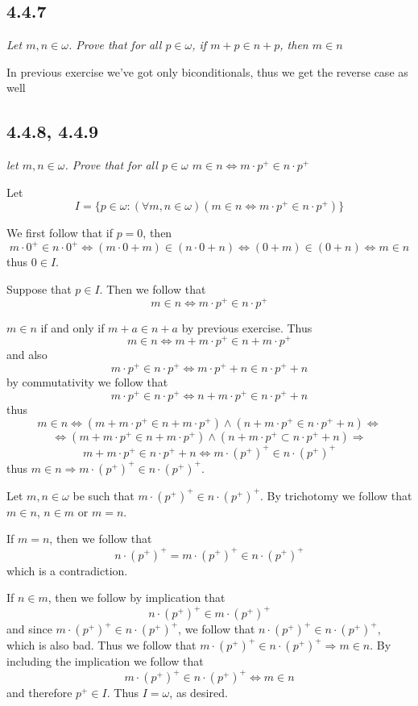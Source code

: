 \documentclass[11pt,oneside,titlepage]{book}
\DeclareMathOperator \lra {\Leftrightarrow}
\DeclareMathOperator \ra {\Rightarrow}
\begin{document}
\subsection*{4.4.7}

\textit{Let $m, n \in \omega$. Prove that for all $p \in \omega$, if $m + p \in n + p$, then
  $m \in n$}

In previous exercise we've got only biconditionals, thus we get the reverse case as well

\subsection*{4.4.8, 4.4.9}

\textit{let $m, n \in \omega$. Prove that for all $p \in \omega$ $m \in n \lra
  m \cdot p^+ \in n \cdot p^+$}

Let
$$I = \{p \in \omega: (\forall m, n \in \omega)( m \in n \lra  m \cdot p^+ \in n \cdot p^+)\}$$

We first follow that if $p = 0$, then
$$m \cdot 0^+ \in n \cdot 0^+ \lra (m \cdot 0 + m) \in (n \cdot 0 + n) \lra (0 + m) \in (0 + n)
\lra m \in n$$
thus $0 \in I$.

Suppose that $p \in I$. Then we follow that
$$m \in n \lra m \cdot p^+ \in n \cdot p^+$$

$m \in n$ if and only if $m + a \in n + a$ by previous exercise. Thus
$$m \in n \lra m + m \cdot p^+ \in n + m \cdot p^+$$
and also
$$ m \cdot p^+ \in n \cdot p^+ \lra  m \cdot p^+ + n \in n \cdot p^+  + n$$
by commutativity we follow that
$$ m \cdot p^+ \in n \cdot p^+ \lra  n + m \cdot p^+ \in n \cdot p^+  + n$$
thus
$$m \in n \lra (m + m \cdot p^+ \in n + m \cdot p^+) \land (n + m \cdot p^+ \in n \cdot p^+  + n)
\lra$$
$$\lra (m + m \cdot p^+ \in n + m \cdot p^+) \land
(n + m \cdot p^+ \subset n \cdot p^+  + n) \ra$$
$$ m + m \cdot p^+ \in n \cdot p^+  + n \lra m \cdot (p^+)^+ \in n \cdot (p^+)^+$$
thus $m \in n \ra m \cdot (p^+)^+ \in n \cdot (p^+)^+$.

Let $m, n \in \omega$ be such that
$m \cdot (p^+)^+ \in n \cdot (p^+)^+$. By trichotomy we
follow that $m \in n$, $n \in m$ or $m = n$.

If $m = n$, then we follow that
$$n \cdot (p^+)^+ = m \cdot (p^+)^+ \in n \cdot (p^+)^+$$
which is a contradiction.

If $n \in m$, then we follow by implication that 
$$n \cdot (p^+)^+ \in m \cdot (p^+)^+$$
and since $m \cdot (p^+)^+ \in n \cdot (p^+)^+$, we follow that
$n \cdot (p^+)^+ \in n \cdot (p^+)^+$, which is also bad. Thus we follow that
$m \cdot (p^+)^+ \in n \cdot (p^+)^+ \ra m \in n$. By including the implication we follow that
$$m \cdot (p^+)^+ \in n \cdot (p^+)^+ \lra m \in n$$
and therefore $p^+ \in I$. Thus $I = \omega$, as desired.
\end{document}
